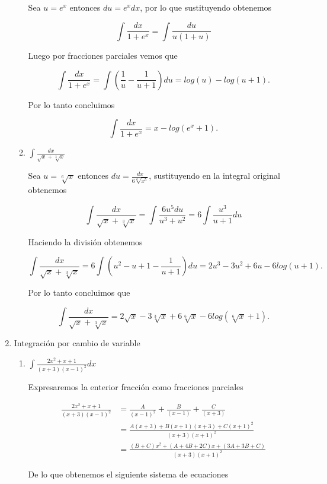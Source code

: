 \documentclass[letterpaper]{article}
\theoremstyle{definition}
\theoremstyle{lemathm}
\theoremstyle{lemademthm}
\begin{document}
\begin{enumerate}
\begin{enumerate}
			Sea $u = e^x$ entonces $du = e^xdx$, por lo que sustituyendo obtenemos

			\[\int \frac{dx}{1+e^x} = \int \frac{du}{u(1+u)}\]

			Luego por fracciones parciales vemos que

			\[\int \frac{dx}{1+e^x} = \int \left(\frac{1}{u} - \frac{1}{u+1}\right)du = log(u) - log(u+1).\]

			Por lo tanto concluimos

			\[\int \frac{dx}{1+e^x} = x - log(e^x+1).\]

            \item $\int \frac{dx}{\sqrt{x} + \sqrt[3]{x}}$
			
			Sea $u = \sqrt[6]{x}$ entonces $du = \frac{dx}{6\sqrt[6]{x^5}}$, sustituyendo en la integral original obtenemos

			\[\int \frac{dx}{\sqrt{x} + \sqrt[3]{x}} = \int \frac{6u^5du}{u^3 + u^2} = 6\int \frac{u^3}{u + 1} du\]

			Haciendo la división obtenemos

			\[\int \frac{dx}{\sqrt{x} + \sqrt[3]{x}} = 6\int \left(u^2 - u + 1 - \frac{1}{u + 1}\right) du = 2u^3 - 3u^2 + 6u - 6log(u+1).\]

			Por lo tanto concluimos que

			\[\int \frac{dx}{\sqrt{x} + \sqrt[3]{x}} = 2\sqrt{x} - 3\sqrt[3]{x} + 6\sqrt[6]{x} - 6log(\sqrt[6]{x}+1).\]

        \end{enumerate}

        \item Integración por cambio de variable
        
        \begin{enumerate}
            \item $\int \frac{2x^2+x+1}{(x+3)(x-1)^2} dx$
			
			Expresaremos la enterior fracción como fracciones parciales

			\begin{align*}
				\frac{2x^2+x+1}{(x+3)(x-1)^2} &= \frac{A}{(x-1)^2}+\frac{B}{(x-1)}+\frac{C}{(x+3)}\\
				&= \frac{A(x+3) + B(x+1)(x+3) + C(x+1)^2}{(x+3)(x+1)^2}\\
				&= \frac{(B + C)x^2 + (A + 4B + 2C)x + (3A + 3B + C)}{(x+3)(x+1)^2}
			\end{align*}

			De lo que obtenemos el siguiente sistema de ecuaciones


\end{enumerate}
\end{enumerate}
\end{document}
